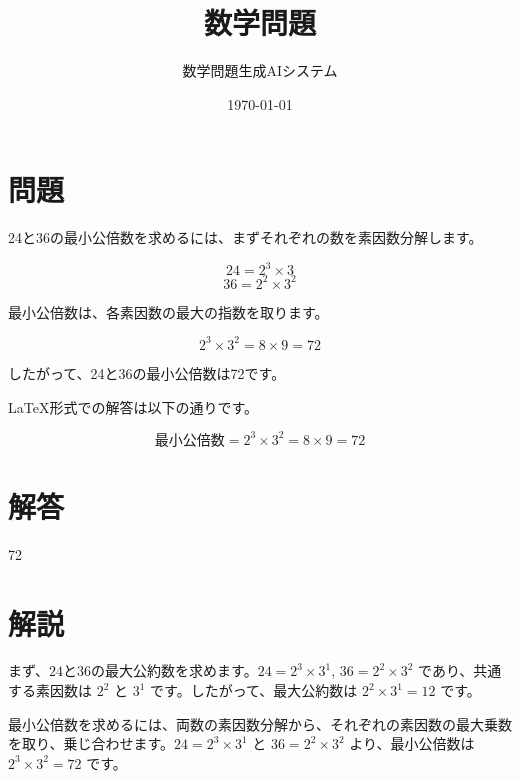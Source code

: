 \documentclass[a4paper,11pt]{article}
\title{数学問題}
\author{数学問題生成AIシステム}
\date{\today}
\numberwithin{equation}{section}
\theoremstyle{definition}
\theoremstyle{remark}
\begin{document}
\maketitle

\section*{問題}

24と36の最小公倍数を求めるには、まずそれぞれの数を素因数分解します。

\[24 = 2^3 \times 3\]
\[36 = 2^2 \times 3^2\]

最小公倍数は、各素因数の最大の指数を取ります。

\[2^3 \times 3^2 = 8 \times 9 = 72\]

したがって、24と36の最小公倍数は72です。

LaTeX形式での解答は以下の通りです。

\[
\text{最小公倍数} = 2^3 \times 3^2 = 8 \times 9 = 72
\]



\section*{解答}

72

\section*{解説}

まず、$24$と$36$の最大公約数を求めます。$24 = 2^3 \times 3^1$, $36 = 2^2 \times 3^2$ であり、共通する素因数は $2^2$ と $3^1$ です。したがって、最大公約数は $2^2 \times 3^1 = 12$ です。

最小公倍数を求めるには、両数の素因数分解から、それぞれの素因数の最大乗数を取り、乗じ合わせます。$24 = 2^3 \times 3^1$ と $36 = 2^2 \times 3^2$ より、最小公倍数は $2^3 \times 3^2 = 72$ です。
\end{document}
